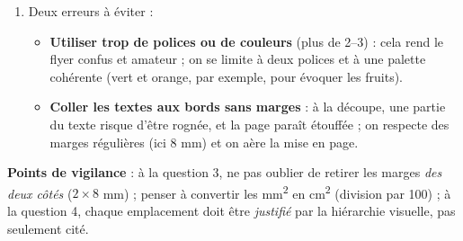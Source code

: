 \documentclass[11pt]{article}
\begin{document}
\begin{corrige}
\begin{enumerate}
\begin{itemize}
\item \textbf{Le visuel} (photo de jus de fruits colorés) : en haut ou au centre, car c'est lui qui attire l'œil ;
\item \textbf{L'offre ou l'argument commercial} (produits, prix, promotion) : au centre, mis en valeur, car c'est le message principal ;
\item \textbf{Les coordonnées} (quartier Marché A à Bafoussam, téléphone) : en bas de page, car le lecteur convaincu les cherche en dernier pour passer à l'action.
\end{itemize}
\item Deux erreurs à éviter :
\begin{itemize}
\item \textbf{Utiliser trop de polices ou de couleurs} (plus de 2--3) : cela rend le flyer confus et amateur ; on se limite à deux polices et à une palette cohérente (vert et orange, par exemple, pour évoquer les fruits).
\item \textbf{Coller les textes aux bords sans marges} : à la découpe, une partie du texte risque d'être rognée, et la page paraît étouffée ; on respecte des marges régulières (ici 8 mm) et on aère la mise en page.
\end{itemize}
\end{enumerate}
\textbf{Points de vigilance} : à la question 3, ne pas oublier de retirer les marges \emph{des deux côtés} ($2 \times 8$ mm) ; penser à convertir les mm\textsuperscript{2} en cm\textsuperscript{2} (division par 100) ; à la question 4, chaque emplacement doit être \emph{justifié} par la hiérarchie visuelle, pas seulement cité.
\end{corrige}
\end{document}
